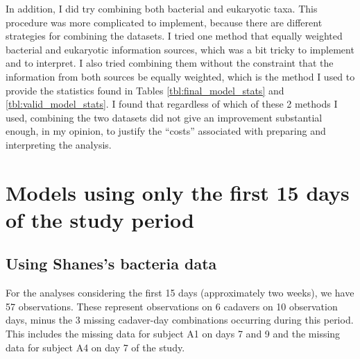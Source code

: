 \documentclass{article}
\begin{document}
In addition, I did try combining both bacterial and eukaryotic taxa.
This procedure was more complicated to implement, because there are
different strategies for combining the datasets.  I tried one method
that equally weighted bacterial and eukaryotic information sources,
which was a bit tricky to implement and to interpret.  I also tried
combining them without the constraint that the information from both
sources be equally weighted, which is the method I used to provide the
statistics found in Tables \ref{tbl:final_model_stats} and
\ref{tbl:valid_model_stats}.  I found that regardless of which of
these 2 methods I used, combining the two datasets did not give an
improvement substantial enough, in my opinion, to justify the
``costs'' associated with preparing and interpreting the analysis.


\section{Models using only the first 15 days of the study period}

\subsection{Using Shanes's bacteria data}

For the analyses considering the first 15 days (approximately two
weeks), we have 57 observations.  These represent observations on 6
cadavers on 10 observation days, minus the 3 missing cadaver-day
combinations occurring during this period.  This includes the missing
data for subject A1 on days 7 and 9 and the missing data for subject
A4 on day 7 of the study.
\end{document}
